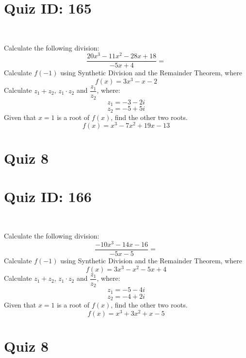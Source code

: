 \documentclass{exam}
\begin{document}
\section*{Quiz ID: 165}
\vspace{0.5cm}\
\vspace{1cm}\
\begin{questions}
\question Calculate the following division:\[\dfrac{
20x^3 - 11x^2 - 28x + 18}{
-5x + 4}=\] \makeemptybox{\stretch{2}}
\question Calculate $f(-1)$ using Synthetic Division and the Remainder Theorem, where\[f(x) = 
3x^3 - x - 2\]
\newpage\question Calculate $z_1+z_2$, $z_1\cdot z_2$ and $\dfrac{z_1}{z_2}$, where:\[z_1=-3-2\mathit{i}\]\[z_2=-5+5\mathit{i}\]
\question Given that $x=1$ is a root of $f(x)$, find the other two roots.\[f(x)=
x^3 - 7x^2 + 19x - 13\]\makeemptybox{\stretch{1}}
\end{questions}\newpage
\newpage
\section*{Quiz 8}
\section*{Quiz ID: 166}
\vspace{0.5cm}\
\vspace{1cm}\
\begin{questions}
\question Calculate the following division:\[\dfrac{
-10x^3 - 14x - 16}{
-5x - 5}=\] 
\question Calculate $f(-1)$ using Synthetic Division and the Remainder Theorem, where\[f(x) = 
3x^3 - x^2 - 5x + 4\]
\newpage\question Calculate $z_1+z_2$, $z_1\cdot z_2$ and $\dfrac{z_1}{z_2}$, where:\[z_1=-5-4\mathit{i}\]\[z_2=-4+2\mathit{i}\]\makeemptybox{\stretch{1}}
\question Given that $x=1$ is a root of $f(x)$, find the other two roots.\[f(x)=
x^3 + 3x^2 + x - 5\]\makeemptybox{\stretch{1}}
\end{questions}\newpage
\newpage
\section*{Quiz 8}
\end{document}
